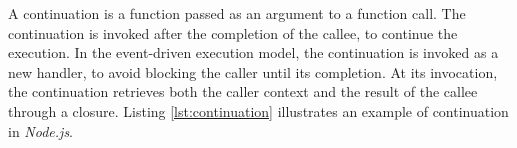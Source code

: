 

A continuation is a function passed as an argument to a function call.
The continuation is invoked after the completion of the callee, to continue the execution. %
In the event-driven execution model, the continuation is invoked as a new handler, to avoid blocking the caller until its completion.
At its invocation, the continuation retrieves both the caller context and the result of the callee through a closure.
Listing \ref{lst:continuation} illustrates an example of continuation in \textit{Node.js}.


